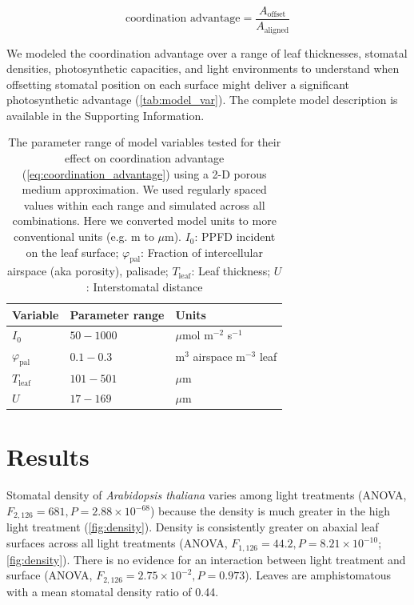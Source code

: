 \documentclass[webpdf,large,modern,unnumsec,namedate]{oup-authoring-template}
\begin{document}
\begin{equation} \label{eq:coordination_advantage}
  \text{coordination advantage} = \frac{A_\text{offset}}{A_\text{aligned}}
\end{equation}

We modeled the coordination advantage over a range of leaf thicknesses,
stomatal densities, photosynthetic capacities, and light environments to
understand when offsetting stomatal position on each surface might
deliver a significant photosynthetic advantage
(\autoref{tab:model_var}). The complete model description is available
in the Supporting Information.

\begin{table}

\caption{\label{tab:model_var}The parameter range of model variables tested for their effect on coordination advantage (\autoref{eq:coordination_advantage}) using a 2-D porous medium approximation. We used regularly spaced values within each range and simulated across all combinations. Here we converted model units to more conventional units (e.g. m to $\mu$m). $I_0$: PPFD incident on the leaf surface; $\varphi_\text{pal}$: Fraction of intercellular airspace (aka porosity), palisade; $T_\text{leaf}$: Leaf thickness; $U$: Interstomatal distance}
\centering
\begin{tabular}[t]{lll}
\toprule
Variable & Parameter range & Units\\
\midrule
$I_0$ & $50-1000$ & $\mu$mol m$^{-2}$ s$^{-1}$\\
$\varphi_\text{pal}$ & $0.1-0.3$ & m$^3$ airspace m$^{-3}$ leaf\\
$T_\text{leaf}$ & $101-501$ & $\mu$m\\
$U$ & $17-169$ & $\mu$m\\
\bottomrule
\end{tabular}
\end{table}

\hypertarget{results}{%
\section{Results}\label{results}}

Stomatal density of \emph{Arabidopsis thaliana} varies among light
treatments (ANOVA, \(F_{2,126} = 681, P = 2.88 \times 10^{-68}\))
because the density is much greater in the high light treatment
(\autoref{fig:density}). Density is consistently greater on abaxial leaf
surfaces across all light treatments (ANOVA,
\(F_{1,126} = 44.2, P = 8.21 \times 10^{-10}\); \autoref{fig:density}).
There is no evidence for an interaction between light treatment and
surface (ANOVA, \(F_{2,126} = 2.75 \times 10^{-2}, P = 0.973\)). Leaves
are amphistomatous with a mean stomatal density ratio of 0.44.
\end{document}
